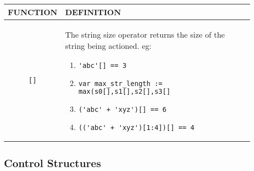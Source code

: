 \begin{tabular}{|c|p{}|}
\hline
FUNCTION& DEFINITION\\
\hline
\verb'[]'& The string size operator returns the size of the string 
 being actioned. eg:
\begin{enumerate}
\item\verb"'abc'[] == 3"
\item\verb"var max_str_length := max(s0[],s1[],s2[],s3[]"
\item\verb"('abc' + 'xyz')[] == 6"
\item\verb"(('abc' + 'xyz')[1:4])[] == 4"
\end{enumerate}\\
  \hline
\end{tabular}

\subsection{Control Structures}
